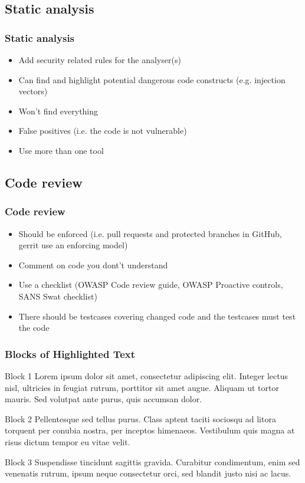 \documentclass{beamer}
\begin{document}
  \subsection{Static analysis}
    \begin{frame}
      \frametitle{Static analysis}
      \begin{itemize}
        \item Add security related rules for the analyser(s)
        \item Can find and highlight potential dangerous code constructs (e.g. injection vectors)
        \item Won't find everything
        \item False positives (i.e. the code is not vulnerable)
        \item Use more than one tool
      \end{itemize}
    \end{frame}

  \subsection{Code review}
    \begin{frame}
      \frametitle{Code review}
      \begin{itemize}
        \item Should be enforced (i.e. pull requests and protected branches in GitHub, gerrit use an enforcing model)
        \item Comment on code you dont't understand
        \item Use a checklist (OWASP Code review guide, OWASP Proactive controls, SANS Swat checklist)
        \item There should be testcases covering changed code and the testcases must test the code
      \end{itemize}
    \end{frame}

\begin{frame}
\frametitle{Blocks of Highlighted Text}
\begin{block}{Block 1}
Lorem ipsum dolor sit amet, consectetur adipiscing elit. Integer lectus nisl, ultricies in feugiat rutrum, porttitor sit amet augue. Aliquam ut tortor mauris. Sed volutpat ante purus, quis accumsan dolor.
\end{block}

\begin{block}{Block 2}
Pellentesque sed tellus purus. Class aptent taciti sociosqu ad litora torquent per conubia nostra, per inceptos himenaeos. Vestibulum quis magna at risus dictum tempor eu vitae velit.
\end{block}

\begin{block}{Block 3}
Suspendisse tincidunt sagittis gravida. Curabitur condimentum, enim sed venenatis rutrum, ipsum neque consectetur orci, sed blandit justo nisi ac lacus.
\end{block}
\end{frame}
\end{document}
